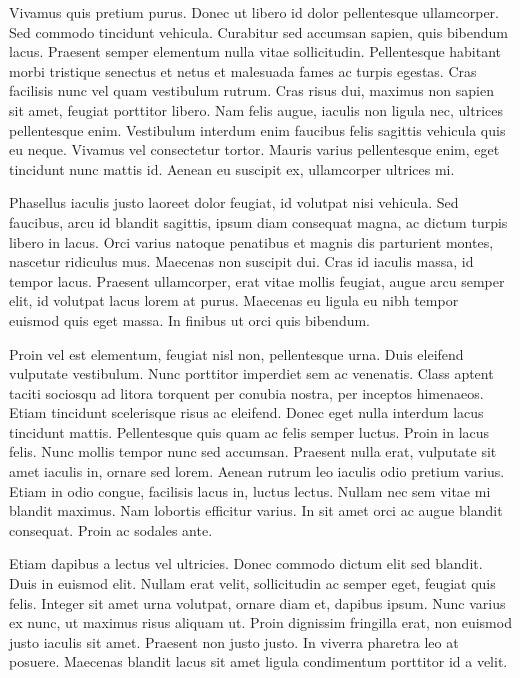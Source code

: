 Vivamus quis pretium purus. Donec ut libero id dolor pellentesque ullamcorper. Sed commodo tincidunt vehicula. Curabitur sed accumsan sapien, quis bibendum lacus. Praesent semper elementum nulla vitae sollicitudin. Pellentesque habitant morbi tristique senectus et netus et malesuada fames ac turpis egestas. Cras facilisis nunc vel quam vestibulum rutrum. Cras risus dui, maximus non sapien sit amet, feugiat porttitor libero. Nam felis augue, iaculis non ligula nec, ultrices pellentesque enim. Vestibulum interdum enim faucibus felis sagittis vehicula quis eu neque. Vivamus vel consectetur tortor. Mauris varius pellentesque enim, eget tincidunt nunc mattis id. Aenean eu suscipit ex, ullamcorper ultrices mi.

Phasellus iaculis justo laoreet dolor feugiat, id volutpat nisi vehicula. Sed faucibus, arcu id blandit sagittis, ipsum diam consequat magna, ac dictum turpis libero in lacus. Orci varius natoque penatibus et magnis dis parturient montes, nascetur ridiculus mus. Maecenas non suscipit dui. Cras id iaculis massa, id tempor lacus. Praesent ullamcorper, erat vitae mollis feugiat, augue arcu semper elit, id volutpat lacus lorem at purus. Maecenas eu ligula eu nibh tempor euismod quis eget massa. In finibus ut orci quis bibendum.

Proin vel est elementum, feugiat nisl non, pellentesque urna. Duis eleifend vulputate vestibulum. Nunc porttitor imperdiet sem ac venenatis. Class aptent taciti sociosqu ad litora torquent per conubia nostra, per inceptos himenaeos. Etiam tincidunt scelerisque risus ac eleifend. Donec eget nulla interdum lacus tincidunt mattis. Pellentesque quis quam ac felis semper luctus. Proin in lacus felis. Nunc mollis tempor nunc sed accumsan. Praesent nulla erat, vulputate sit amet iaculis in, ornare sed lorem. Aenean rutrum leo iaculis odio pretium varius. Etiam in odio congue, facilisis lacus in, luctus lectus. Nullam nec sem vitae mi blandit maximus. Nam lobortis efficitur varius. In sit amet orci ac augue blandit consequat. Proin ac sodales ante.

Etiam dapibus a lectus vel ultricies. Donec commodo dictum elit sed blandit. Duis in euismod elit. Nullam erat velit, sollicitudin ac semper eget, feugiat quis felis. Integer sit amet urna volutpat, ornare diam et, dapibus ipsum. Nunc varius ex nunc, ut maximus risus aliquam ut. Proin dignissim fringilla erat, non euismod justo iaculis sit amet. Praesent non justo justo. In viverra pharetra leo at posuere. Maecenas blandit lacus sit amet ligula condimentum porttitor id a velit.

